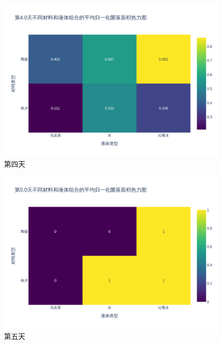 \documentclass[12pt,a4paper]{ctexart}
\begin{document}
\begin{figure}[H]  %
    \centering  %
    \includegraphics[width=\textwidth]{./plot/SingleDay/heatmap_normalized_day4.0.png}  %
    \caption{第四天}  %
    \label{fig:SingleDayHeat4}  %
\end{figure}

\begin{figure}[H]  %
    \centering  %
    \includegraphics[width=\textwidth]{./plot/SingleDay/heatmap_normalized_day5.0.png}  %
    \caption{第五天}  %
    \label{fig:SingleDayHeat5}  %
\end{figure}
\newpage
\end{document}
